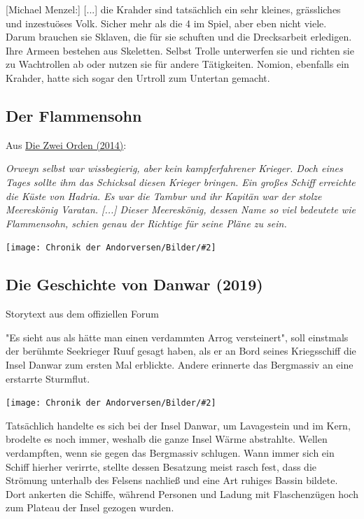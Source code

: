 \documentclass[10pt, a4paper, oneside]{book}
\newcommand{\fillbreak}{\vspace*{\fill}\columnbreak}
\newcommand{\storytext}[1]{%
    \section{#1}%
    \label{Storytext: #1}%
}
\newcommand{\refstorytext}[1]{\hyperref[Storytext: #1]{#1}}
\newcommand{\bildmitts}[2][height=0.32\textwidth,width=0.48\textwidth,keepaspectratio]{%
    \begin{center}
        \texttt{[image: Chronik der Andorversen/Bilder/\#2]}
    \end{center}
}
\newcommand{\bildlinks}[2][height=0.32\textwidth,width=0.48\textwidth,keepaspectratio]{%
    \begin{figure}
        \texttt{[image: Chronik der Andorversen/Bilder/\#2]}
    \end{figure}
}
\begin{document}
\begin{multicols}{2}

[Michael Menzel:] [...] die Krahder sind tatsächlich ein sehr kleines, grässliches und inzestuöses Volk. Sicher mehr als die 4 im Spiel, aber eben nicht viele. Darum brauchen sie Sklaven, die für sie schuften und die Drecksarbeit erledigen. Ihre Armeen bestehen aus Skeletten. Selbst Trolle unterwerfen sie und richten sie zu Wachtrollen ab oder nutzen sie für andere Tätigkeiten. Nomion, ebenfalls ein Krahder, hatte sich sogar den Urtroll zum Untertan gemacht.




\begin{chapterbox}
    \chapter{Der Flammensohn}
    
    \begin{center}
        Aus \refstorytext{Die Zwei Orden (2014)}:
    \end{center}
    
    \textit{Orweyn selbst war wissbegierig, aber kein kampferfahrener Krieger. Doch eines Tages sollte ihm das Schicksal diesen Krieger bringen. Ein großes Schiff erreichte die Küste von Hadria. Es war die Tambur und ihr Kapitän war der stolze Meereskönig Varatan. [...] Dieser Meereskönig, dessen Name so viel bedeutete wie Flammensohn, schien genau der Richtige für seine Pläne zu sein.}
    
    \bildmitts[width=\textwidth]{Varatan.jpg}    
\end{chapterbox}




\fillbreak
\storytext{Die Geschichte von Danwar (2019)}

\begin{center}
    Storytext aus dem offiziellen Forum
\end{center}

"Es sieht aus als hätte man einen verdammten Arrog versteinert", soll einstmals der berühmte Seekrieger Ruuf gesagt haben, als er an Bord seines Kriegsschiff die Insel Danwar zum ersten Mal erblickte. Andere erinnerte das Bergmassiv an eine erstarrte Sturmflut.

\bildmitts{Die Geschichte von Danwar (2019).jpg}

Tatsächlich handelte es sich bei der Insel Danwar, um Lavagestein und im Kern, brodelte es noch immer, weshalb die ganze Insel Wärme abstrahlte. Wellen verdampften, wenn sie gegen das Bergmassiv schlugen. Wann immer sich ein Schiff hierher verirrte, stellte dessen Besatzung meist rasch fest, dass die Strömung unterhalb des Felsens nachließ und eine Art ruhiges Bassin bildete. Dort ankerten die Schiffe, während Personen und Ladung mit Flaschenzügen hoch zum Plateau der Insel gezogen wurden.\bigskip


\end{multicols}
\end{document}
